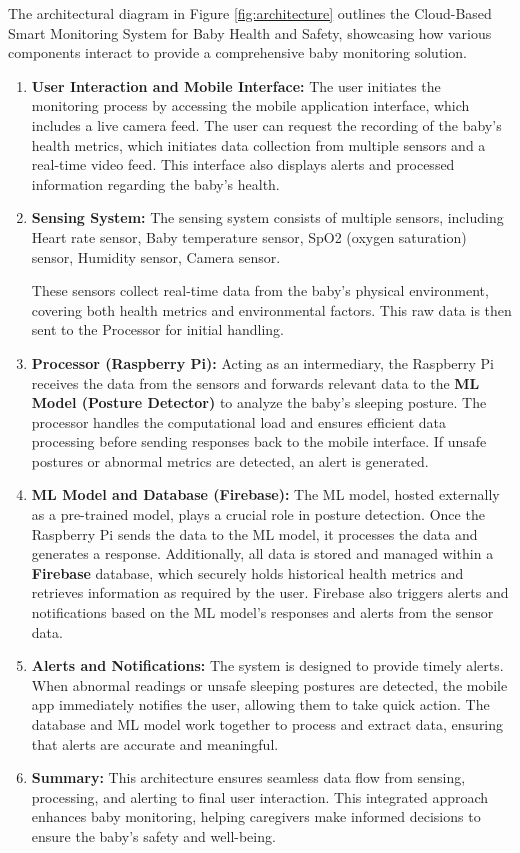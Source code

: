 \documentclass[12pt,a4paper]{report}
\begin{document}
The architectural diagram in Figure \ref{fig:architecture} outlines the Cloud-Based Smart Monitoring System for Baby Health and Safety, showcasing how various components interact to provide a comprehensive baby monitoring solution.
\begin{enumerate}
\item \textbf{User Interaction and Mobile Interface:} The user initiates the monitoring process by accessing the mobile application interface, which includes a live camera feed. The user can request the recording of the baby’s health metrics, which initiates data collection from multiple sensors and a real-time video feed. This interface also displays alerts and processed information regarding the baby’s health.
\item \textbf{Sensing System:} The sensing system consists of multiple sensors, including Heart rate sensor, Baby temperature sensor, SpO2 (oxygen saturation) sensor, Humidity sensor, Camera sensor.

These sensors collect real-time data from the baby’s physical environment, covering both health metrics and environmental factors. This raw data is then sent to the Processor for initial handling.

\item \textbf{Processor (Raspberry Pi):} Acting as an intermediary, the Raspberry Pi receives the data from the sensors and forwards relevant data to the \textbf{ML Model (Posture Detector)} to analyze the baby’s sleeping posture. The processor handles the computational load and ensures efficient data processing before sending responses back to the mobile interface. If unsafe postures or abnormal metrics are detected, an alert is generated.

\item \textbf{ML Model and Database (Firebase):} The ML model, hosted externally as a pre-trained model, plays a crucial role in posture detection. Once the Raspberry Pi sends the data to the ML model, it processes the data and generates a response. Additionally, all data is stored and managed within a \textbf{Firebase} database, which securely holds historical health metrics and retrieves information as required by the user. Firebase also triggers alerts and notifications based on the ML model’s responses and alerts from the sensor data.

\item \textbf{Alerts and Notifications:} The system is designed to provide timely alerts. When abnormal readings or unsafe sleeping postures are detected, the mobile app immediately notifies the user, allowing them to take quick action. The database and ML model work together to process and extract data, ensuring that alerts are accurate and meaningful.

\item \textbf{Summary:} This architecture ensures seamless data flow from sensing, processing, and alerting to final user interaction. This integrated approach enhances baby monitoring, helping caregivers make informed decisions to ensure the baby's safety and well-being.
\end{enumerate}
\end{document}
